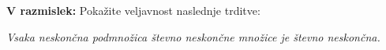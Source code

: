 \documentclass[11pt,paper=b5,footinclude,headinclude]{scrbook} %
\def\inn {{~\wedge~}}
\def\sledi {{~\Rightarrow~}}
\def\cee {{~\Leftrightarrow~}}
\begin{document}
\begin{enumerate}[(1.)]
\medskip
\textbf{V razmislek:} Pokažite veljavnost naslednje trditve:

{\em Vsaka neskončna podmnožica števno neskončne množice je števno neskončna.}


%
%
%
%
%
%
%
%
%
%
%
%
%
%
%
%
%
%


\end{enumerate}
\end{document}
